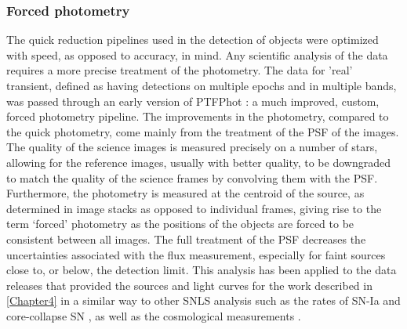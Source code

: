 \subsubsection{Forced photometry}
The quick reduction pipelines used in the detection of objects were optimized with speed, as opposed to accuracy, in mind. Any scientific analysis of the data requires a more precise treatment of the photometry. The data for 'real' transient, defined as having detections on multiple epochs and in multiple bands, was passed through an early version of PTFPhot \citep{Firth2015}: a much improved, custom, forced photometry pipeline. The improvements in the photometry, compared to the quick photometry, come mainly from the treatment of the PSF of the images. The quality of the science images is measured precisely on a number of stars, allowing for the reference images, usually with better quality, to be downgraded to match the quality of the science frames by convolving them with the PSF. Furthermore, the photometry is measured at the centroid of the source, as determined in image stacks as opposed to individual frames, giving rise to the term `forced' photometry as the positions of the objects are forced to be consistent between all images. The full treatment of the PSF decreases the uncertainties associated with the flux measurement, especially for faint sources close to, or below, the detection limit. This analysis has been applied to the data releases that provided the sources and light curves for the work described in \cref{Chapter4} in a similar way to other SNLS analysis such as the rates of SN-Ia \citep{Perrett2012} and core-collapse SN \citep{Bazin2009}, as well as the cosmological measurements \citep{Astier2006,Sullivan2011}.

